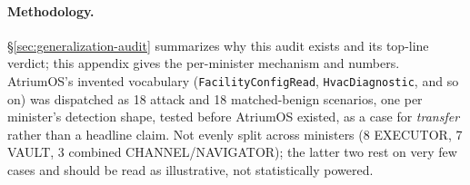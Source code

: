 
\paragraph{Methodology.} \S\ref{sec:generalization-audit} summarizes why
this audit exists and its top-line verdict; this appendix gives the
per-minister mechanism and numbers. AtriumOS's invented vocabulary
(\texttt{FacilityConfigRead}, \texttt{HvacDiagnostic}, and so on) was
dispatched as 18 attack and 18 matched-benign scenarios, one per
minister's detection shape, tested before AtriumOS existed, as a case for
\emph{transfer} rather than a headline claim. Not evenly split across
ministers (8 EXECUTOR, 7 VAULT, 3 combined CHANNEL/NAVIGATOR); the latter
two rest on very few cases and should be read as illustrative, not
statistically powered.

